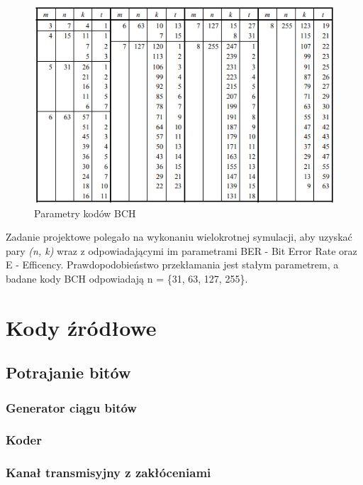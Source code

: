 \documentclass[12pt,a4paper,notitlepage]{report}
\begin{document}
    \begin{figure}[H]
        \centering       
        \includegraphics[width=\textwidth]{BCH_table.png}
        \caption{Parametry kodów BCH}
        \label{fig:obrazek BCH_table}
    \end{figure}
    Zadanie projektowe polegało na wykonaniu wielokrotnej symulacji, aby uzyskać pary \textit{(n, k)} wraz z odpowiadającymi im parametrami BER - Bit Error Rate oraz E - Efficency. Prawdopodobieństwo przekłamania jest stałym parametrem, a badane kody BCH odpowiadają n = \{31, 63, 127, 255\}.
    \chapter{Kody źródłowe}
    \section{Potrajanie bitów}
    \subsection{Generator ciągu bitów}
     \hfill \break
    \subsection{Koder}
     \hfill \break
    \subsection{Kanał transmisyjny z zakłóceniami}
     \hfill \break
\end{document}
